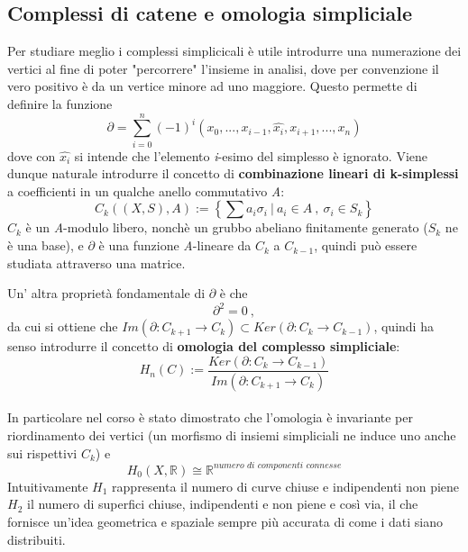 \documentclass{article}
\begin{document}
	\subsection{Complessi di catene e omologia simpliciale}
	Per studiare meglio i complessi simplicicali è utile introdurre una numerazione dei vertici al fine di poter "percorrere" l'insieme in analisi, dove per convenzione il vero positivo è da un vertice minore ad uno maggiore. Questo permette di definire la funzione \[\partial= \sum_{i=0}^n (-1)^i (x_0,...,x_{i-1},\hat{x_i},x_{i+1},...,x_n)\] dove con \(\hat{x_i}\) si intende che l'elemento \textit{i}-esimo del simplesso è ignorato. Viene dunque naturale introdurre il concetto di \textbf{combinazione lineari di k-simplessi} a coefficienti in un qualche anello commutativo \textit{A}:
	\[C_k((X,S),A):= \left\{\sum a_i\sigma_i\ |\ a_i\in A\ ,\ \sigma_i\in S_k\right\}\]
	\(C_k\) è un \textit{A}-modulo libero, nonchè un grubbo abeliano finitamente generato (\(S_k\) ne è una base), e \(\partial\) è una funzione \textit{A}-lineare da \(C_k\) a \(C_{k-1}\), quindi può essere studiata attraverso una matrice. 
	\vspace{1cm}
	
	\vspace{1cm}
	Un' altra proprietà fondamentale di \(\partial\) è che \[\partial^2=0\ ,\] da cui si ottiene che \(Im(\partial:C_{k+1}\rightarrow C_k)\subset Ker(\partial:C_{k}\rightarrow C_{k-1})\), quindi ha senso introdurre il concetto di \textbf{omologia del complesso simpliciale}:\\\[H_n(C):=\frac{Ker(\partial:C_{k}\rightarrow C_{k-1})}{Im(\partial:C_{k+1}\rightarrow C_k)}\]\\
	In particolare nel corso è stato dimostrato che l'omologia è invariante per riordinamento dei vertici (un morfismo di insiemi simpliciali ne induce uno anche sui rispettivi \(C_k\)) e\\ \[H_0(X,\mathbb{R})\cong\mathbb{R}^{\textit{numero di componenti connesse}}\]
	Intuitivamente \(H_1\) rappresenta il numero di curve chiuse e indipendenti non piene \(H_2\) il numero di superfici chiuse, indipendenti e non piene e così via, il che fornisce un'idea geometrica e spaziale sempre più accurata di come i dati siano distribuiti.
	\vspace{1cm}
	
	\vspace{1cm}
	
	\vspace{1cm}
\end{document}

